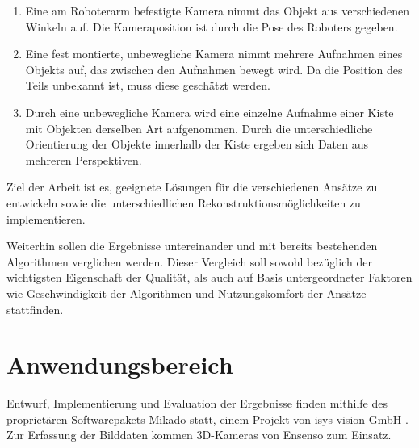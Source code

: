 \begin{enumerate}
\item Eine am Roboterarm befestigte Kamera nimmt das Objekt aus verschiedenen Winkeln auf.
Die Kameraposition ist durch die Pose des Roboters gegeben.
\item Eine fest montierte, unbewegliche Kamera nimmt mehrere Aufnahmen eines Objekts auf, das zwischen den Aufnahmen bewegt wird.
Da die Position des Teils unbekannt ist, muss diese geschätzt werden.
\item Durch eine unbewegliche Kamera wird eine einzelne Aufnahme einer Kiste mit Objekten derselben Art aufgenommen.
Durch die unterschiedliche Orientierung der Objekte innerhalb der Kiste ergeben sich Daten aus mehreren Perspektiven.
\end{enumerate}

Ziel der Arbeit ist es, geeignete Lösungen für die verschiedenen Ansätze zu entwickeln sowie die unterschiedlichen Rekonstruktionsmöglichkeiten zu implementieren.

Weiterhin sollen die Ergebnisse untereinander und mit bereits bestehenden Algorithmen verglichen werden.
Dieser Vergleich soll sowohl bezüglich der wichtigsten Eigenschaft der Qualität, als auch auf Basis untergeordneter Faktoren wie Geschwindigkeit der Algorithmen und Nutzungskomfort der Ansätze stattfinden.



\section{Anwendungsbereich}
\label{sec:anwendungsbereich}

Entwurf, Implementierung und Evaluation der Ergebnisse finden mithilfe des proprietären Softwarepakets Mikado \cite{mikadoWebsite} statt, einem Projekt von isys vision GmbH \cite{isysWebsite}.
Zur Erfassung der Bilddaten kommen 3D-Kameras von Ensenso \cite{ensensoWebsite} zum Einsatz.
